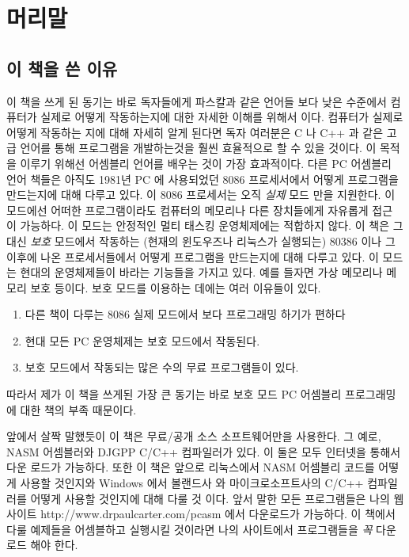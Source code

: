 ﻿%

\chapter{머리말}

\section*{이 책을 쓴 이유}

이 책을 쓰게 된 동기는 바로 독자들에게 파스칼과 같은 언어들 보다
낮은 수준에서 컴퓨터가 실제로 어떻게 작동하는지에 대한 자세한 
이해를 위해서 이다. 컴퓨터가 실제로 어떻게 작동하는 지에 대해 자세히
알게 된다면 독자 여러분은 C 나 C++ 과 같은 고급 언어를 통해 
프로그램을 개발하는것을 훨씬 효율적으로 할 수 있을 것이다. 
이 목적을 이루기 위해선 어셈블리 언어를 배우는 것이 가장 효과적이다. 
다른 PC 어셈블리 언어 책들은 아직도 1981년 PC 에 사용되었던
8086 프로세서에서 어떻게 프로그램을 만드는지에 대해 다루고 있다. 이
8086 프로세서는 오직 \emph{실제} 모드 만을 지원한다. 이 모드에선
어떠한 프로그램이라도 컴퓨터의 메모리나 다른 장치들에게 자유롭게 접근
이 가능하다. 이 모드는 안정적인 멀티 태스킹 운영체제에는 적합하지 않다.
이 책은 그 대신 \emph{보호} 모드에서 작동하는 (현재의 윈도우즈나 리눅스가 실행되는)
80386 이나 그 이후에 나온 프로세서들에서 어떻게 프로그램을 만드는지에 대해
다루고 있다. 이 모드는 현대의 운영체제들이 바라는 기능들을 가지고 있다.
예를 들자면 가상 메모리나 메모리 보호 등이다. 
보호 모드를 이용하는 데에는 여러 이유들이 있다. 

\begin{enumerate}
\item 다른 책이 다루는 8086 실제 모드에서 보다 프로그래밍 하기가
      편하다
\item 현대 모든 PC 운영체제는 보호 모드에서 작동된다. 
\item 보호 모드에서 작동되는 많은 수의 무료 프로그램들이 있다. 
\end{enumerate}
따라서 제가 이 책을 쓰게된 가장 큰 동기는 바로 보호 모드 PC 어셈블리 
프로그래밍에 대한 책의 부족 때문이다. 

앞에서 살짝 말했듯이 이 책은 무료/공개 소스 소프트웨어만을 사용한다. 
그 예로, NASM 어셈블러와 DJGPP C/C++ 컴파일러가 있다. 이 둘은 모두 
인터넷을 통해서 다운 로드가 가능하다. 또한 이 책은 앞으로 리눅스에서
NASM 어셈블리 코드를 어떻게 사용할 것인지와 Windows 에서 볼랜드사
와 마이크로소프트사의 C/C++ 컴파일러를 어떻게 사용할 것인지에 대해 
다룰 것 이다.
앞서 말한 모든 프로그램들은 나의 웹사이트 http://www.drpaulcarter.com/pcasm 
에서 다운로드가 가능하다. 이 책에서 다룰 예제들을 어셈블하고 실행시킬 것이라면
나의 사이트에서 프로그램들을 \emph{꼭} 다운로드 해야 한다. 


